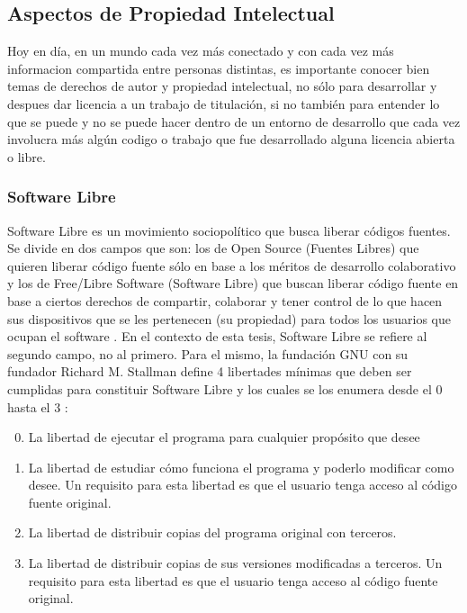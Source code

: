 \subsection{Aspectos de Propiedad Intelectual}
Hoy en día, en un mundo cada vez más conectado y con cada vez más informacion compartida entre personas distintas, es importante conocer bien temas de derechos de autor y propiedad intelectual, no sólo para desarrollar y despues dar licencia a un trabajo de titulación, si no también para entender lo que se puede y no se puede hacer dentro de un entorno de desarrollo que cada vez involucra más algún codigo o trabajo que fue desarrollado alguna licencia abierta o libre.

\subsubsection{Software Libre}
Software Libre es un movimiento sociopolítico que busca liberar códigos fuentes. Se divide en dos campos que son: los de Open Source (Fuentes Libres) que quieren liberar código fuente sólo en base a los méritos de desarrollo colaborativo y los de Free/Libre Software (Software Libre) que buscan liberar código fuente en base a ciertos derechos de compartir, colaborar y tener control de lo que hacen sus dispositivos que se les pertenecen (su propiedad) para todos los usuarios que ocupan el software \citep{GNU-FLOSS-vs-FOSS} \citep{GNU-Open-vs-Free}. En el contexto de esta tesis, Software Libre se refiere al segundo campo, no al primero. Para el mismo, la fundación GNU con su fundador Richard M. Stallman define 4 libertades mínimas que deben ser cumplidas para constituir Software Libre y los cuales se los enumera desde el 0 hasta el 3 \citep{GNU-Freedom} \citep{GNU-Free-Software}:

\begin{enumerate}
  \setcounter{enumi}{-1}
  \item La libertad de ejecutar el programa para cualquier propósito que desee
  \item La libertad de estudiar cómo funciona el programa y poderlo modificar como desee. Un requisito para esta libertad es que el usuario tenga acceso al código fuente original.
  \item La libertad de distribuir copias del programa original con terceros.
  \item La libertad de distribuir copias de sus versiones modificadas a terceros. Un requisito para esta libertad es que el usuario tenga acceso al código fuente original.
\end{enumerate}

